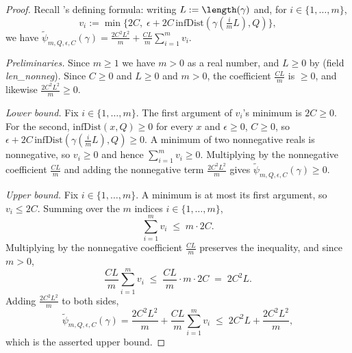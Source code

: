 \begin{proof}
  Recall 's defining formula: writing $L := \length(\gamma)$ and, for
  $i \in \{1,\dots,m\}$,
  \[
    v_i := \min\bigl\{2C,\; \epsilon + 2C\,\mathrm{infDist}(\gamma(\tfrac{i}{m}L),Q)\bigr\}
    ,
  \]
  we have $\tilde\psi_{m,Q,\epsilon,C}(\gamma) = \frac{2C^2L^2}{m} + \frac{CL}{m}\sum_{i=1}^m v_i$.

  \emph{Preliminaries.} Since $m \ge 1$ we have $m > 0$ as a real number, and $L \ge 0$ by
   (field \emph{len\_nonneg}). Since $C \ge 0$ and $L \ge 0$ and $m > 0$, the
  coefficient $\tfrac{CL}{m}$ is $\ge 0$, and likewise $\tfrac{2C^2L^2}{m} \ge 0$.

  \emph{Lower bound.} Fix $i \in \{1,\dots,m\}$. The first argument of $v_i$'s minimum is
  $2C \ge 0$. For the second, $\mathrm{infDist}(x,Q)\ge0$ for every $x$ and $\epsilon \ge 0$,
  $C \ge 0$, so $\epsilon + 2C\,\mathrm{infDist}(\gamma(\tfrac{i}{m}L),Q) \ge 0$. A minimum of two
  nonnegative reals is nonnegative, so $v_i \ge 0$ and hence $\sum_{i=1}^m v_i \ge 0$. Multiplying
  by the nonnegative coefficient $\tfrac{CL}{m}$ and adding the nonnegative term
  $\tfrac{2C^2L^2}{m}$ gives $\tilde\psi_{m,Q,\epsilon,C}(\gamma) \ge 0$.

  \emph{Upper bound.} Fix $i \in \{1,\dots,m\}$. A minimum is at most its first argument, so
  $v_i \le 2C$. Summing over the $m$ indices $i \in \{1,\dots,m\}$,
  \[
    \sum_{i=1}^m v_i \;\le\; m \cdot 2C
    .
  \]
  Multiplying by the nonnegative coefficient $\tfrac{CL}{m}$ preserves the inequality, and since
  $m>0$,
  \[
    \frac{CL}{m}\sum_{i=1}^m v_i \;\le\; \frac{CL}{m}\cdot m\cdot 2C \;=\; 2C^2L
    .
  \]
  Adding $\tfrac{2C^2L^2}{m}$ to both sides,
  \[
    \tilde\psi_{m,Q,\epsilon,C}(\gamma)
      = \frac{2C^2L^2}{m} + \frac{CL}{m}\sum_{i=1}^m v_i
      \;\le\; 2C^2L + \frac{2C^2L^2}{m}
    ,
  \]
  which is the asserted upper bound.
\end{proof}

